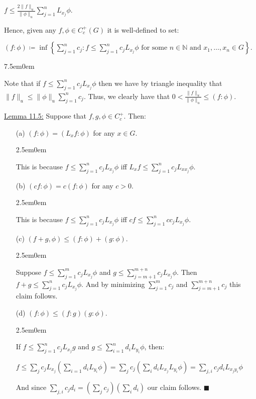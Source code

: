 \documentclass{book}
\newcommand{\pracTwo}{
   \color{Orange}%
   \fontsize{12}{14}\selectfont%
}
\newcommand{\exTwo}{%
   \color{Purple}%
   \fontsize{13}{15}\selectfont%
}
\newcommand{\exThreeP}{%
   \color{RedViolet}%
   \fontsize{12}{14}\selectfont%
}
\newenvironment{myIndent}{%
   \begin{adjustwidth}{2.5em}{0em}%
}{%
   \end{adjustwidth}%
}
\newenvironment{myTindent}{%
   \begin{adjustwidth}{7.5em}{0em}%
}{%
   \end{adjustwidth}%
}
\newcommand{\retTwo}{\hfill\bigbreak}
\begin{document}
{\centering $f \leq \frac{2\|f\|_u}{\|\phi\|_u}\sum_{j=1}^n L_{x_j} \phi$. \retTwo\par}

Hence, given any $f, \phi \in C_c^+(G)$ it is well-defined to set:

{\centering$(f : \phi) \coloneqq \inf\left\{ \sum_{j=1}^n c_j : f \leq \sum_{j=1}^n c_j L_{x_j}\phi \text{ for some } n \in \mathbb{N} \text{ and } x_1, \ldots, x_n \in G\right\}$.\retTwo\par}

\begin{myTindent}\pracTwo
	Note that if $f \leq \sum_{j=1}^n c_j L_{x_j}\phi$ then we have by triangle inequality that\\ $\|f\|_u \leq \|\phi\|_u\sum_{j=1}^n c_j$. Thus, we clearly have that $0 < \frac{\|f\|_u}{\|\phi\|_u} \leq (f : \phi)$.\retTwo
\end{myTindent}

\exTwo\ul{Lemma 11.5:} Suppose that $f, g, \phi \in C_c^+$. Then:
\begin{enumerate}
	\item[(a)] $(f : \phi) = (L_x f : \phi)$ for any $x \in G$.
	
	\begin{myIndent}\exThreeP
		This is because $f \leq \sum_{j=1}^n c_j L_{x_j} \phi$ iff $L_x f \leq \sum_{j=1}^n c_j L_{xx_j}\phi$.\newpage
	\end{myIndent}

	\item[(b)] $(cf : \phi) = c(f : \phi)$ for any $c > 0$.

	\begin{myIndent}\exThreeP
		This is because $f \leq \sum_{j=1}^n c_j L_{x_j} \phi$ iff $cf \leq \sum_{j=1}^n cc_j L_{x_j}\phi$.\retTwo
	\end{myIndent}

	\item[(c)] $(f + g, \phi) \leq (f : \phi) + (g : \phi)$.
	
	\begin{myIndent}\exThreeP
		Suppose $f \leq \sum_{j=1}^m c_j L_{x_j}\phi$ and $g \leq \sum_{j={m + 1}}^{m + n}c_j L_{x_j}\phi$. Then $f + g \leq \sum_{j=1}^n c_j L_{x_j}\phi$. And by minimizing $\sum_{j=1}^m c_j$ and $\sum_{j={m + 1}}^{m + n}c_j$ this claim follows.\retTwo
	\end{myIndent}

	\item[(d)] $(f : \phi) \leq (f : g)(g : \phi)$.
	
	\begin{myIndent}\exThreeP
		If $f \leq \sum_{j=1}^n c_j L_{x_j} g$ and $g \leq \sum_{i=1}^n d_i L_{y_i}\phi$, then:
		
		{\centering$f \leq \sum_{j} c_j L_{x_j}(\sum_{i=1} d_i L_{y_i}\phi) = \sum_{j} c_j (\sum_{i} d_i L_{x_j}L_{y_i}\phi) = \sum_{j, i} c_j d_i L_{x_j y_i}\phi$\retTwo\par}

		And since $\sum_{j, i} c_j d_i = (\sum_{j} c_j)(\sum_{i}d_i)$ our claim follows. $\blacksquare$\retTwo
	\end{myIndent}
\end{enumerate}
\end{document}
